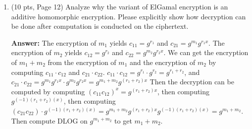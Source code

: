 \documentclass[10pt]{article}
\begin{document}
\begin{enumerate}
	\bigskip\item (10 pts, Page 12) Analyze why the variant of ElGamal encryption is an additive homomorphic encryption. Please explicitly show how decryption can be done after computation is conducted on the ciphertext.
	
	\textbf{Answer:} \newline The encryption of $m_1$ yields $c_{11}=g^{r_1}$ and $c_{21}=g^{m_1}g^{r_1x}$. The encryption of $m_2$ yields $c_{12}=g^{r_2}$ and $c_{22}=g^{m_2}g^{r_2x}$. We can get the encryption of $m_1 + m_2$ from the encryption of $m_1$ and the encryption of $m_2$ by computing $c_{11}\cdot c_{12}$ and $c_{21}\cdot c_{22}$. \newline $c_{11}\cdot c_{12}=g^{r_1}\cdot g^{r_2}=g^{r_1+r_2}$, and $c_{21}\cdot c_{22}=g^{m_1}g^{r_1x}\cdot g^{m_2}g^{r_2x} = g^{m_1+m_2}g^{(r_1+r_2)x}$ \newline Then the decryption can be computed by computing $(c_{11}c_{12})^x=g^{(r_1+r_2)x}$, then computing $g^{(-1)(r_1+r_2)(x)}$, then computing $(c_{21}c_{22})\cdot g^{(-1)(r_1+r_2)(x)} = g^{m_1+m_2}g^{(r_1+r_2)x}g^{(-1)(r_1+r_2)(x)} = g^{m_1+m_2}$. Then compute DLOG on $g^{m_1+m_2}$ to get $m_1+m_2$. 
\end{enumerate}
\end{document}
